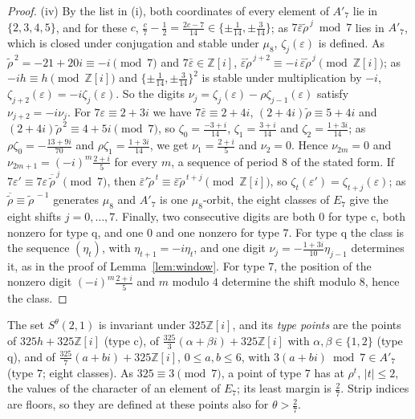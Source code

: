 \documentclass[11pt,a4paper]{amsart}
\theoremstyle{remark}
\newcommand{\Z}{\mathbb{Z}}
\begin{document}
\begin{proof}
(iv) By the list in (i), both coordinates of every element of $A'_7$ lie in $\{2,3,4,5\}$, and for these $c$,
$\frac c7-\frac12=\frac{2c-7}{14}\in\{\pm\frac1{14},\pm\frac3{14}\}$; as $7\bar\varepsilon\tilde\rho^{\,j}\bmod7$ lies in
$A'_7$, which is closed under conjugation and stable under $\mu_8$, $\zeta_j(\varepsilon)$ is defined. As $\tilde\rho^{\,2}=-21+20i\equiv-i\pmod7$ and $7\bar\varepsilon\in\Z[i]$,
$\bar\varepsilon\tilde\rho^{\,j+2}\equiv-i\,\bar\varepsilon\tilde\rho^{\,j}\pmod{\Z[i]}$; as $-ih\equiv h\pmod{\Z[i]}$
and $\{\pm\frac1{14},\pm\frac3{14}\}^2$ is stable under multiplication by $-i$, $\zeta_{j+2}(\varepsilon)=
-i\zeta_j(\varepsilon)$. So the digits $\nu_j=\zeta_j(\varepsilon)-\rho\zeta_{j-1}(\varepsilon)$ satisfy
$\nu_{j+2}=-i\nu_j$. For $7\varepsilon\equiv2+3i$ we have $7\bar\varepsilon\equiv2+4i$, $(2+4i)\tilde\rho\equiv5+4i$
and $(2+4i)\tilde\rho^{\,2}\equiv4+5i\pmod7$, so $\zeta_0=\frac{-3+i}{14}$, $\zeta_1=\frac{3+i}{14}$ and
$\zeta_2=\frac{1+3i}{14}$; as $\rho\zeta_0=-\frac{13+9i}{70}$ and $\rho\zeta_1=\frac{1+3i}{14}$, we get
$\nu_1=\frac{2+i}5$ and $\nu_2=0$. Hence $\nu_{2m}=0$ and $\nu_{2m+1}=(-i)^m\frac{2+i}5$ for every $m$, a sequence
of period $8$ of the stated form. If $7\varepsilon'\equiv7\varepsilon\,\overline{\tilde\rho}^{\,j}\pmod7$, then
$\bar\varepsilon'\tilde\rho^{\,t}\equiv\bar\varepsilon\tilde\rho^{\,t+j}\pmod{\Z[i]}$, so
$\zeta_t(\varepsilon')=\zeta_{t+j}(\varepsilon)$; as $\overline{\tilde\rho}\equiv\tilde\rho^{\,-1}$ generates $\mu_8$
and $A'_7$ is one $\mu_8$-orbit, the eight classes of $E_7$ give the eight shifts $j=0,\dots,7$. Finally, two
consecutive digits are both $0$ for type c, both nonzero for type q, and one $0$ and one nonzero for type $7$. For
type q the class is the sequence $(\eta_t)$, with $\eta_{t+1}=-i\eta_t$, and one digit
$\nu_j=-\frac{1+3i}{10}\eta_{j-1}$ determines it, as in the proof of Lemma~\ref{lem:window}. For type $7$, the position of the nonzero digit $(-i)^m\frac{2+i}5$ and $m$ modulo $4$
determine the shift modulo $8$, hence the class.
\end{proof}

The set $S^\theta(2,1)$ is invariant under $325\Z[i]$, and its \emph{type points} are the points of $325h+325\Z[i]$
(type c), of $\frac{325}3(\alpha+\beta i)+325\Z[i]$ with $\alpha,\beta\in\{1,2\}$ (type q), and of
$\frac{325}7(a+bi)+325\Z[i]$, $0\le a,b\le6$, with $3(a+bi)\bmod7\in A'_7$ (type $7$; eight classes). As $325\equiv3\pmod7$, a point of type
$7$ has at $\rho^t$, $|t|\le2$, the values of the character of an element of $E_7$; its least margin is $\frac27$.
Strip indices are floors, so they are defined at these points also for $\theta>\frac27$.
\end{document}
